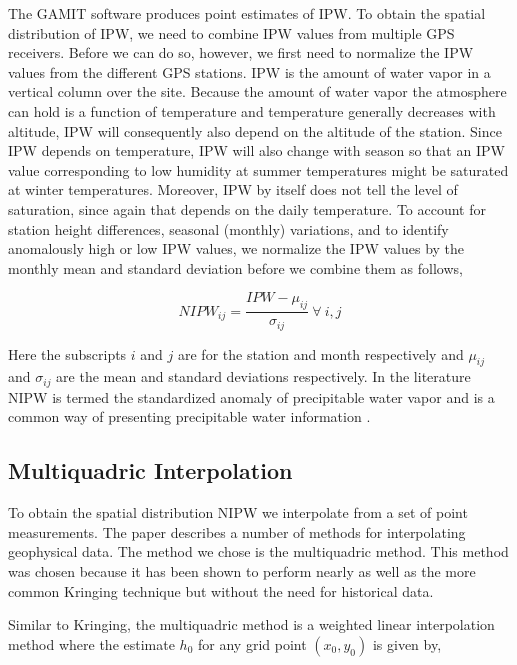 \documentclass[proposal]{umassthesis}
\begin{document}
{The GAMIT software produces point estimates of IPW. To obtain the spatial distribution of IPW, we need to combine IPW values from multiple GPS receivers. Before we can do so, however, we first need to normalize the IPW values from the different GPS stations. IPW is the amount of water vapor in a vertical column over the site. Because the amount of water vapor the atmosphere can hold is a function of temperature and temperature generally decreases with altitude, IPW will consequently also depend on the altitude of the station. Since IPW depends on temperature, IPW will also change with season so that an IPW value corresponding to low humidity at summer temperatures might be saturated at winter temperatures. Moreover, IPW by itself does not tell the level of saturation, since again that depends on the daily temperature. To account for station height differences, seasonal (monthly) variations, and to identify anomalously high or low IPW values, we normalize the IPW values by the monthly mean and standard deviation before we combine them as follows,

\begin{equation}
NIPW_{ij} = \dfrac{IPW - \mu_{ij}}{\sigma_{ij}} \ \forall \ i,j
\end{equation}

Here the subscripts $i$ and $j$ are for the station and month respectively and $\mu_{ij}$ and $\sigma_{ij}$ are the mean and standard deviations respectively. In the literature NIPW is termed the standardized anomaly of precipitable water vapor and is a common way of presenting precipitable water information \cite{grumm2001standardized}.

\subsection{Multiquadric Interpolation}

To obtain the spatial distribution NIPW we interpolate from a set of point measurements. The paper \cite{tabios1985comparative} describes a number of methods for interpolating geophysical data. The method we chose is the multiquadric method. This method was chosen because it has been shown to perform nearly as well as the more common Kringing technique \cite{radhakrishna2015precipitable} but without the need for historical data.

Similar to Kringing, the multiquadric method is a weighted linear interpolation method where the estimate $h_0$ for any grid point $(x_0,y_0)$ is given by,

}
\end{document}
